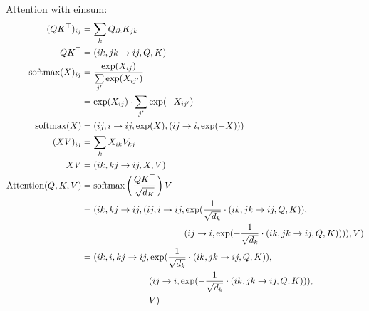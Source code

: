 Attention with einsum:
\begin{align*}
    (QK^\T)_{ij}              & = \sum\limits_{k} Q_{ik} K_{jk}                                                                                                                       \\
    QK^\T                     & = (ik, jk \rightarrow ij, Q, K)                                                                                                                       \\
    \text{softmax}(X)_{ij}    & = \frac{\exp(X_{ij})}{\sum\limits_{j'} \exp(X_{ij'})}                                                                                                 \\
                              & = \exp(X_{ij}) \cdot \sum\limits_{j'} \exp(-X_{ij'})                                                                                                  \\
    \text{softmax}(X)         & = (ij, i \rightarrow ij, \exp(X), (ij \rightarrow i, \exp(-X)))                                                                                       \\
    (XV)_{ij}                 & = \sum\limits_{k} X_{ik} V_{kj}                                                                                                                       \\
    XV                        & = (ik, kj \rightarrow ij, X, V)                                                                                                                       \\
    \text{Attention}(Q, K, V) & = \text{softmax}\left(\frac{Q K^\T}{\sqrt{d_K}}\right)V                                                                                               \\
                              & = (ik, kj \rightarrow ij, (ij, i \rightarrow ij, \exp(\frac{1}{\sqrt{d_k}} \cdot (ik, jk \rightarrow ij, Q, K)),                                      \\
                              & \phantom{{}= (ik, kj \rightarrow ij, (ij, i \rightarrow ij,} (ij \rightarrow i, \exp(-\frac{1}{\sqrt{d_k}} \cdot (ik, jk \rightarrow ij, Q, K)))), V) \\
                              & = (ik, i, kj \rightarrow ij, \exp(\frac{1}{\sqrt{d_k}} \cdot (ik, jk \rightarrow ij, Q, K)),                                                          \\
                              & \phantom{{}= (ik, i, kj \rightarrow ij,} (ij \rightarrow i, \exp(-\frac{1}{\sqrt{d_k}} \cdot (ik, jk \rightarrow ij, Q, K))),                         \\
                              & \phantom{{}= (ik, i, kj \rightarrow ij,} V)
\end{align*}

\blindtext[1]